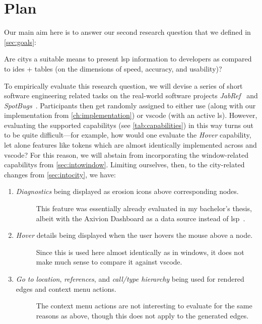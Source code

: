 \documentclass[../thesis]{subfiles}
\begin{document}
\section{Plan}\label{sec:plan}
Our main aim here is to answer our second research question that we defined in \cref{sec:goals}:
\begin{displayquote}
	Are \glspl{city} a suitable means to present \gls{lsp} information to developers as compared to \glspl{ide} + tables (on the dimensions of speed, accuracy, and usability)?
\end{displayquote}

To empirically evaluate this research question, we will devise a series of short software engineering related tasks on the real-world software projects \emph{JabRef}~\cite{jabref} and \emph{SpotBugs}~\cite{spotbugs}.
Participants then get randomly assigned to either use \SEE{} (along with our implementation from \cref{ch:implementation}) or \gls{vscode} (with an active \gls{ls}).
However, evaluating the supported \glspl{capability} (see \cref{tab:capabilities}) in this way turns out to be quite difficult---for example, how would one evaluate the \emph{Hover} \gls{capability}, let alone features like \glspl{token} which are almost identically implemented across \SEE{} and \gls{vscode}?
For this reason, we will abstain from incorporating the \gls{window}-related \glspl{capability} from \cref{sec:intowindow}.
Limiting ourselves, then, to the \gls{city}-related changes from \cref{sec:intocity}, we have:
\begin{enumerate}
	\item \emph{Diagnostics} being displayed as erosion icons above corresponding nodes.
	      \begin{description}
		      \item[\follows{}] This feature was essentially already evaluated in my bachelor's thesis, albeit with the Axivion Dashboard as a data source instead of \gls{lsp}~\cite{galperin2021,galperin2022}.
	      \end{description}
	\item \emph{Hover} details being displayed when the user hovers the mouse above a node.
	      \begin{description}
		      \item[\follows{}] Since this is used here almost identically as in \glspl{window}, it does not make much sense to compare it against \gls{vscode}.
	      \end{description}
	\item \emph{Go to location}, \emph{references}, and \emph{call/type hierarchy} being used for rendered edges and context menu actions.
	      \begin{description}
		      \item[\follows{}] The context menu actions are not interesting to evaluate for the same reasons as above, though this does not apply to the generated edges.
	      \end{description}
\end{enumerate}
\end{document}
